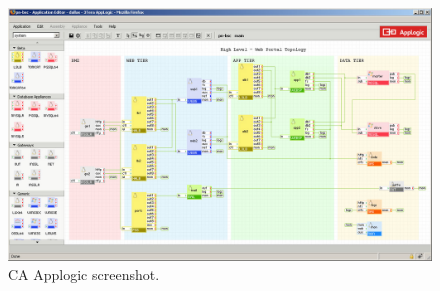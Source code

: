 \begin{figure}[tb]
  \includegraphics[width=\linewidth]{img/applogic.jpg}
  \caption{CA Applogic screenshot.}
  \label{fig:applogic}
\end{figure}
